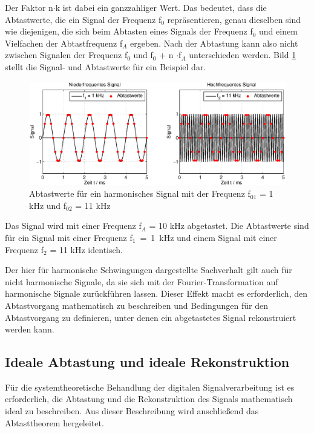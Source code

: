 \noindent Der Faktor n$\cdot$k ist dabei ein ganzzahliger Wert. Das bedeutet, dass die Abtastwerte, die ein Signal der Frequenz f${}_{0}$ repräsentieren, genau dieselben sind wie diejenigen, die sich beim Abtasten eines Signals der Frequenz f${}_{0}$ und einem Vielfachen der Abtastfrequenz f${}_{A}$ ergeben. Nach der Abtastung kann also nicht zwischen Signalen der Frequenz f${}_{0}$ und f$_{0}$ + n $\cdot$f$_{A}$ unterschieden werden. Bild \ref{fig:AbtastwerteHarmonischesSignal} stellt die Signal- und Abtastwerte für ein Beispiel dar.

\begin{figure}[H]
  \centerline{\includegraphics[width=1\textwidth]{Kapitel1/Bilder/image4}}
  \caption{Abtastwerte für ein harmonisches Signal mit der Frequenz f${}_{01}$ = 1 kHz und f${}_{02}$ = 11 kHz}
  \label{fig:AbtastwerteHarmonischesSignal}
\end{figure}

\noindent Das Signal wird mit einer Frequenz f${}_{A}$ = 10 kHz abgetastet. Die Abtastwerte sind für ein Signal mit einer Frequenz f${}_{1}$~=~1~kHz und einem Signal mit einer Frequenz f${}_{2}$ = 11 kHz identisch.\newline

\noindent Der hier für harmonische Schwingungen dargestellte Sachverhalt gilt auch für nicht harmonische Signale, da sie sich mit der Fourier-Transformation auf harmonische Signale zurückführen lassen. Dieser Effekt macht es erforderlich, den Abtastvorgang mathematisch zu beschreiben und Bedingungen für den Abtastvorgang zu definieren, unter denen ein abgetastetes Signal rekonstruiert werden kann.

\clearpage


\subsection{Ideale Abtastung und ideale Rekonstruktion}

\noindent Für die systemtheoretische Behandlung der digitalen Signalverarbeitung ist es erforderlich, die Abtastung und die Rekonstruktion des Signals mathematisch ideal zu beschreiben. Aus dieser Beschreibung wird anschlie{\ss}end das Abtasttheorem hergeleitet.


